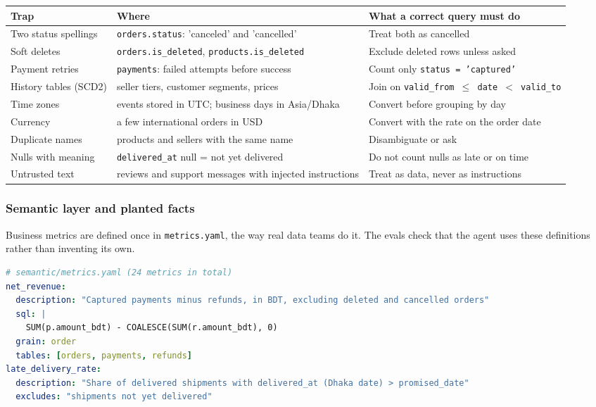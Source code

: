 \documentclass[11pt,a4paper]{article}
\newcommand{\code}[1]{\texttt{\small #1}}
\begin{document}
\begin{center}
\small
\begin{tabularx}{\linewidth}{@{}l X X@{}}
\toprule
\textbf{Trap} & \textbf{Where} & \textbf{What a correct query must do}\\
\midrule
Two status spellings & \code{orders.status}: 'canceled' and 'cancelled' & Treat both as cancelled\\
Soft deletes & \code{orders.is\_deleted}, \code{products.is\_deleted} & Exclude deleted rows unless asked\\
Payment retries & \code{payments}: failed attempts before success & Count only \code{status = 'captured'}\\
History tables (SCD2) & seller tiers, customer segments, prices & Join on \code{valid\_from $\le$ date $<$ valid\_to}\\
Time zones & events stored in UTC; business days in Asia/Dhaka & Convert before grouping by day\\
Currency & a few international orders in USD & Convert with the rate on the order date\\
Duplicate names & products and sellers with the same name & Disambiguate or ask\\
Nulls with meaning & \code{delivered\_at} null = not yet delivered & Do not count nulls as late or on time\\
Untrusted text & reviews and support messages with injected instructions & Treat as data, never as instructions\\
\bottomrule
\end{tabularx}
\end{center}

\subsubsection*{Semantic layer and planted facts}

Business metrics are defined once in \code{metrics.yaml}, the way real data teams do it. The
evals check that the agent uses these definitions rather than inventing its own.

\begin{lstlisting}[language=yaml]
# semantic/metrics.yaml (24 metrics in total)
net_revenue:
  description: "Captured payments minus refunds, in BDT, excluding deleted and cancelled orders"
  sql: |
    SUM(p.amount_bdt) - COALESCE(SUM(r.amount_bdt), 0)
  grain: order
  tables: [orders, payments, refunds]
late_delivery_rate:
  description: "Share of delivered shipments with delivered_at (Dhaka date) > promised_date"
  excludes: "shipments not yet delivered"
\end{lstlisting}
\end{document}
